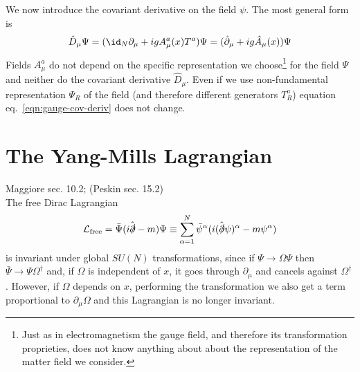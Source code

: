 \documentclass[TheoreticalPhy_ModB.tex]{subfiles}
\begin{document}
We now introduce the covariant derivative on the field $\psi$. The most general form is
\begin{equation}\label{eqn:gauge-cov-deriv}
\hat D_\mu\Psi=(\id_N\partial_\mu+igA_\mu^a(x)T^a)\Psi=(\hat \partial_\mu+ig\hat A_\mu(x))\Psi
\end{equation}
Fields $A_\mu^a$ do not depend on the specific representation we choose\footnote{Just as in electromagnetism the gauge field, and therefore its transformation proprieties, does not know anything about about the representation of the matter field we consider.} for the field $\Psi$ and neither do the covariant derivative $\hat D_\mu$. Even if we use non-fundamental representation $\Psi_R$ of the field (and therefore different generators $T^a_R$) equation eq.~\eqref{eqn:gauge-cov-deriv} does not change. 

\section{The Yang-Mills Lagrangian}

\textsf{Maggiore sec. 10.2; (Peskin sec. 15.2)}\\

The free Dirac Lagrangian 
\[\mathcal L_{\text{free}}=\bar\Psi(i\hat{\slashed\partial}-m)\Psi\equiv\sum_{\alpha=1}^N\bar\psi^\alpha(i(\hat{\slashed\partial}\psi)^\alpha-m\psi^\alpha)\]
is invariant under global $SU(N)$ transformations, since if $\Psi\to\Omega\Psi$ then $\bar\Psi\to\Psi\Omega^\dagger$ and, if $\Omega$ is independent of $x$, it goes through $\partial_\mu$ and cancels against $\Omega^\dagger$. However, if $\Omega$ depends on $x$, performing the transformation we also get a term proportional to $\partial_\mu\Omega$ and this Lagrangian is no longer invariant. 
\end{document}
